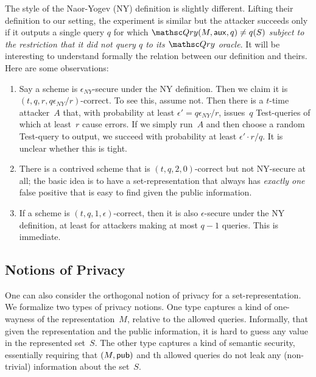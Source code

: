 The style of the Naor-Yogev (NY) definition is slightly different. 
Lifting their definition to our setting, the experiment is similar but the attacker
succeeds only if it outputs a single query $q$ for which $\Qry( M,
\aux, q) \neq q(S)$  \emph{subject to the restriction that it did not query $q$ to its $\Qry$ oracle}.
It will be interesting to understand formally the relation between our definition and theirs.
Here are some observations:
\begin{enumerate}
\item Say a scheme is $\epsilon_{NY}$-secure under the NY definition.
Then we claim it is $(t,q, r, q\epsilon_{NY}/r)$-correct. To see
this, assume not. Then there is a $t$-time attacker~$A$ that, with
probability at least $\epsilon'=q\epsilon_{NY}/r$,
issues~$q$ Test-queries of which at least~$r$ cause errors. If we simply run~$A$ and then choose a random Test-query to
output, we succeed with probability at least $\epsilon' \cdot r/q$. It is unclear whether this is tight.

\item There is a contrived scheme that is $(t, q, 2, 0)$-correct but not NY-secure at all; the basic idea is
to have a set-representation that always has \emph{exactly one} false positive that is easy to find
given the public information.

\item If a scheme is $(t,q,1,\epsilon)$-correct, then it is also $\epsilon$-secure under the NY definition,
at least for attackers making at most $q-1$ queries.
This is immediate.
\end{enumerate}


\subsection{Notions of Privacy}
One can also consider the orthogonal notion of privacy for a
set-representation.  We formalize two types of privacy notions. One
type captures a kind of one-wayness of the representation~$M$,
relative to the allowed queries.  Informally, that given the
representation and the public information, it is hard to guess any
value in the represented set~$S$.  The other type captures a kind of
semantic security, essentially requiring that $(M,{\sf pub})$ and th
allowed queries do not leak any (non-trivial) information about the set~$S$.

